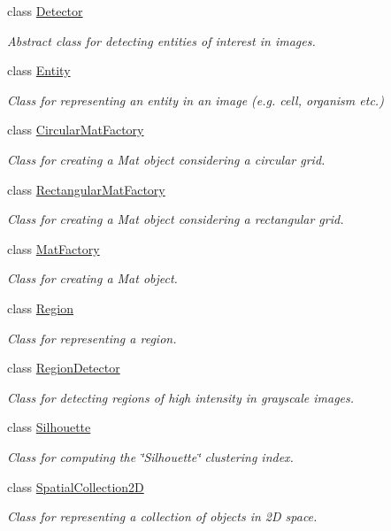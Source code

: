 \begin{DoxyCompactItemize}
class \hyperlink{classmultiscale_1_1analysis_1_1Detector}{Detector}
\begin{DoxyCompactList}\small\item\em Abstract class for detecting entities of interest in images. \end{DoxyCompactList}\item 
class \hyperlink{classmultiscale_1_1analysis_1_1Entity}{Entity}
\begin{DoxyCompactList}\small\item\em Class for representing an entity in an image (e.\-g. cell, organism etc.) \end{DoxyCompactList}\item 
class \hyperlink{classmultiscale_1_1analysis_1_1CircularMatFactory}{Circular\-Mat\-Factory}
\begin{DoxyCompactList}\small\item\em Class for creating a Mat object considering a circular grid. \end{DoxyCompactList}\item 
class \hyperlink{classmultiscale_1_1analysis_1_1RectangularMatFactory}{Rectangular\-Mat\-Factory}
\begin{DoxyCompactList}\small\item\em Class for creating a Mat object considering a rectangular grid. \end{DoxyCompactList}\item 
class \hyperlink{classmultiscale_1_1analysis_1_1MatFactory}{Mat\-Factory}
\begin{DoxyCompactList}\small\item\em Class for creating a Mat object. \end{DoxyCompactList}\item 
class \hyperlink{classmultiscale_1_1analysis_1_1Region}{Region}
\begin{DoxyCompactList}\small\item\em Class for representing a region. \end{DoxyCompactList}\item 
class \hyperlink{classmultiscale_1_1analysis_1_1RegionDetector}{Region\-Detector}
\begin{DoxyCompactList}\small\item\em Class for detecting regions of high intensity in grayscale images. \end{DoxyCompactList}\item 
class \hyperlink{classmultiscale_1_1analysis_1_1Silhouette}{Silhouette}
\begin{DoxyCompactList}\small\item\em Class for computing the \char`\"{}\-Silhouette\char`\"{} clustering index. \end{DoxyCompactList}\item 
class \hyperlink{classmultiscale_1_1analysis_1_1SpatialCollection2D}{Spatial\-Collection2\-D}
\begin{DoxyCompactList}\small\item\em Class for representing a collection of objects in 2\-D space. \end{DoxyCompactList}\end{DoxyCompactItemize}
